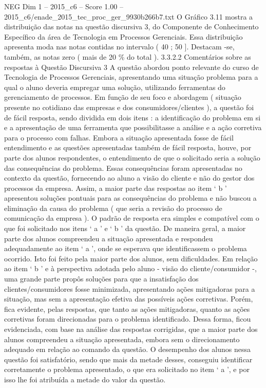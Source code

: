 \begin{textsample}{NEG Dim 1 – 2015\_c6 – Score 1.00 – 2015\_c6/enade\_2015\_tec\_proc\_ger\_9930b266b7.txt}
O Gráfico 3.11 mostra a distribuição das notas na questão discursiva 3, do Componente de Conhecimento Específico da área de Tecnologia em Processos Gerenciais.
Essa distribuição apresenta moda nas notas contidas no intervalo ( 40 ; 50 ].
Destacam -se, também, as notas zero ( mais de 20 \% do total ). 3.3.2.2 Comentários sobre as respostas à Questão Discursiva 3 A questão abordou ponto relevante do curso de Tecnologia de Processos Gerenciais, apresentando uma situação problema para a qual o aluno deveria empregar uma solução, utilizando ferramentas do gerenciamento de processos.
Em função de seu foco e abordagem ( situação presente no cotidiano das empresas e dos consumidores/clientes ), a questão foi de fácil resposta, sendo dividida em dois itens : a identificação do problema em si e a apresentação de uma ferramenta que possibilitasse a análise e a ação corretiva para o processo com falhas.
Embora a situação apresentada fosse de fácil entendimento e as questões apresentadas também de fácil resposta, houve, por parte dos alunos respondentes, o entendimento de que o solicitado seria a solução das consequências do problema.
Essas consequências foram apresentadas no contexto da questão, fornecendo ao aluno a visão do cliente e não do gestor dos processos da empresa.
Assim, a maior parte das respostas ao item ‘ b ’ apresentou soluções pontuais para as consequências do problema e não buscou a eliminação da causa do problema ( que seria a revisão do processo de comunicação da empresa ).
O padrão de resposta era simples e compatível com o que foi solicitado nos itens ‘ a ’ e ‘ b ’ da questão.
De maneira geral, a maior parte dos alunos compreendeu a situação apresentada e respondeu adequadamente ao item ‘ a ’, onde se esperava que identificassem o problema ocorrido.
Isto foi feito pela maior parte dos alunos, sem dificuldades.
Em relação ao item ‘ b ’ e à perspectiva adotada pelo aluno - visão do cliente/consumidor -, uma grande parte propôs soluções para que a insatisfação dos clientes/consumidores fosse minimizada, apresentando ações mitigadoras para a situação, mas sem a apresentação efetiva das possíveis ações corretivas.
Porém, fica evidente, pelas respostas, que tanto as ações mitigadoras, quanto as ações corretivas foram direcionadas para o problema identificado.
Dessa forma, ficou evidenciada, com base na análise das respostas corrigidas, que a maior parte dos alunos compreendeu a situação apresentada, embora sem o direcionamento adequado em relação ao comando da questão.
O desempenho dos alunos nessa questão foi satisfatório, sendo que mais da metade desses, conseguiu identificar corretamente o problema apresentado, o que era solicitado no item ‘ a ’, e por isso lhe foi atribuída a metade do valor da questão.

\end{textsample}
